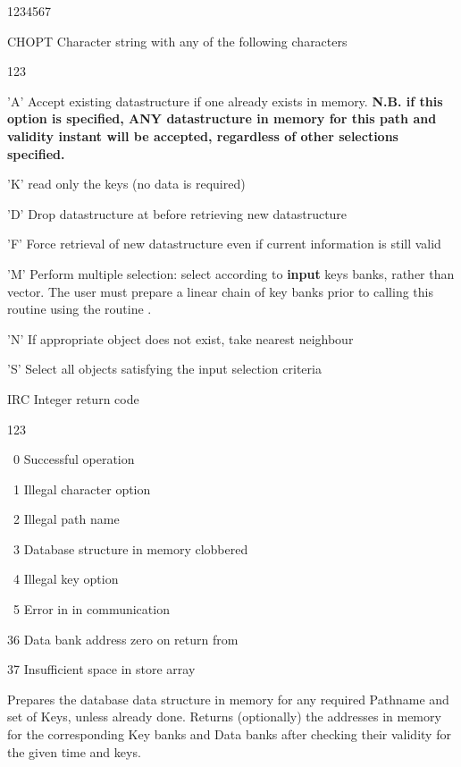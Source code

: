 \begin{DLtt}{1234567}
\item[CHOPT]Character string with any of the following characters
  \begin{DLtt}{123}
    \item['A']Accept existing datastructure if one already exists in memory.
              {\bf N.B. if this option is specified, ANY datastructure in
               memory for this path and validity instant will be accepted,
               regardless of other selections specified.}
    \item['K']read only the keys (no data is required)
    \item['D']Drop datastructure at  before retrieving new datastructure
    \item['F']Force retrieval of new datastructure even if current information
    is still valid
    \item['M']Perform multiple selection: select according to {\bf input}
    keys banks, rather than  vector.
    The user must prepare a linear chain of key banks prior to calling
    this routine using the routine .
    \item['N']If appropriate object does not exist, take nearest neighbour
    \item['S']Select all objects satisfying the input selection criteria
  \end{DLtt}
\item[IRC]Integer return code
  \begin{DLtt}{123}
    \item[\ 0] Successful operation
    \item[\ 1]Illegal character option
    \item[\ 2]Illegal path name
    \item[\ 3]Database structure in memory clobbered
    \item[\ 4]Illegal key option
    \item[\ 5]Error in  in  communication
    \item[36]Data bank address zero on return from 
    \item[37]Insufficient space in  store array
  \end{DLtt}
\end{DLtt}

Prepares the database data structure in memory for any required
Pathname and set of Keys, unless already done.
Returns (optionally) the addresses in memory for the corresponding
Key banks and Data banks after checking their validity for the
given time and keys.

